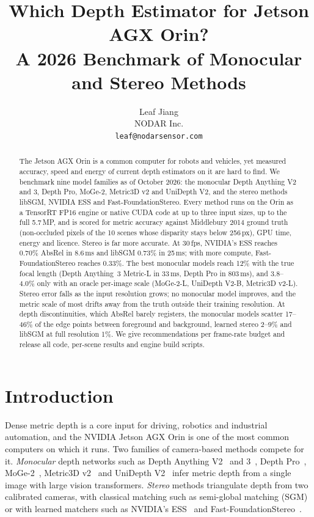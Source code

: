 \documentclass[10pt,twocolumn]{article}
\title{Which Depth Estimator for Jetson AGX Orin?\\\large A 2026 Benchmark of Monocular and Stereo Methods}
\author{Leaf Jiang\\NODAR Inc.\\\texttt{leaf@nodarsensor.com}}
\date{}
\begin{document}
\maketitle

\begin{abstract}
The Jetson AGX Orin is a common computer for robots and vehicles, yet measured accuracy, speed and
energy of current depth estimators on it are hard to find. We benchmark nine model families as of
October 2026: the monocular Depth Anything V2 and 3, Depth Pro, MoGe-2, Metric3D v2 and UniDepth V2,
and the stereo methods libSGM, NVIDIA ESS and Fast-FoundationStereo. Every method runs on the Orin as a
TensorRT FP16 engine or native CUDA code at up to three input sizes, up to the full 5.7\,MP, and is
scored for metric accuracy against Middlebury 2014 ground truth (non-occluded pixels of the 10 scenes
whose disparity stays below 256\,px), GPU time, energy and licence. Stereo is far more accurate. At
30\,fps, NVIDIA's ESS reaches 0.70\% AbsRel in 8.6\,ms and libSGM 0.73\% in 25\,ms; with more compute,
Fast-FoundationStereo reaches 0.33\%. The best monocular models reach 12\% with the true focal length
(Depth Anything~3 Metric-L in 33\,ms, Depth Pro in 803\,ms), and 3.8--4.0\% only with an oracle per-image
scale (MoGe-2-L, UniDepth V2-B, Metric3D v2-L). Stereo error falls as the input resolution grows; no
monocular model improves, and the metric scale of most drifts away from the truth outside their training
resolution. At depth discontinuities, which AbsRel barely registers, the monocular models scatter
17--46\% of the edge points between foreground and background, learned stereo 2--9\% and libSGM at full
resolution 1\%. We give recommendations per frame-rate budget and release all code, per-scene results
and engine build scripts.
\end{abstract}

\section{Introduction}
Dense metric depth is a core input for driving, robotics and industrial automation, and the NVIDIA
Jetson AGX Orin is one of the most common computers on which it runs. Two families of camera-based
methods compete for it. \emph{Monocular} depth networks such as Depth Anything
V2~\cite{yang2024depthv2} and 3~\cite{lin2026da3}, Depth Pro~\cite{bochkovskii2025depthpro},
MoGe-2~\cite{wang2025moge2}, Metric3D v2~\cite{hu2024metric3dv2} and UniDepth
V2~\cite{piccinelli2025unidepthv2} infer metric depth from a single image with large vision
transformers. \emph{Stereo} methods triangulate depth from two calibrated cameras, with classical
matching such as semi-global matching (SGM)~\cite{hirschmuller2008sgm} or with learned matchers such as
NVIDIA's ESS~\cite{nvidia2024ess} and Fast-FoundationStereo~\cite{wen2025fastfoundationstereo}.
\end{document}
